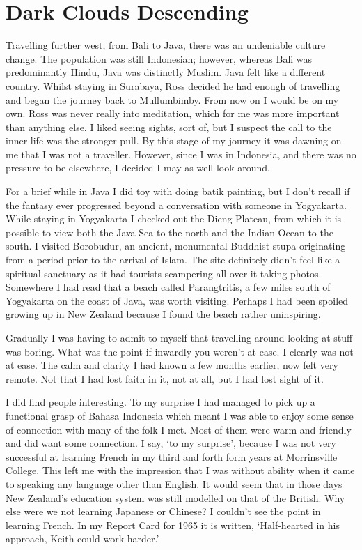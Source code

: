 \chapter{Dark Clouds Descending}

Travelling further west, from Bali to Java, there was an undeniable
culture change. The population was still Indonesian; however, whereas
Bali was predominantly Hindu, Java was distinctly Muslim. Java felt like
a different country. Whilst staying in Surabaya, Ross decided he had
enough of travelling and began the journey back to Mullumbimby. From now
on I would be on my own. Ross was never really into meditation, which
for me was more important than anything else. I liked seeing sights,
sort of, but I suspect the call to the inner life was the stronger pull.
By this stage of my journey it was dawning on me that I was not a
traveller. However, since I was in Indonesia, and there was no pressure
to be elsewhere, I decided I may as well look around.

For a brief while in Java I did toy with doing batik painting, but I
don't recall if the fantasy ever progressed beyond a conversation with
someone in Yogyakarta. While staying in Yogyakarta I checked out the
Dieng Plateau, from which it is possible to view both the Java Sea to
the north and the Indian Ocean to the south. I visited Borobudur\cite{borobudur},
an ancient, monumental Buddhist stupa originating from a
period prior to the arrival of Islam. The site definitely didn't feel
like a spiritual sanctuary as it had tourists scampering all over it
taking photos. Somewhere I had read that a beach called Parangtritis, a
few miles south of Yogyakarta on the coast of Java, was worth visiting.
Perhaps I had been spoiled growing up in New Zealand because I found the
beach rather uninspiring.

Gradually I was having to admit to myself that travelling around looking
at stuff was boring. What was the point if inwardly you weren't at ease.
I clearly was not at ease. The calm and clarity I had known a few months
earlier, now felt very remote. Not that I had lost faith in it, not at
all, but I had lost sight of it.

I did find people interesting. To my surprise I had managed to pick up a
functional grasp of Bahasa Indonesia\cite{bahasa}
which meant I was able to enjoy some sense of
connection with many of the folk I met. Most of them were warm and
friendly and did want some connection. I say, `to my surprise', because
I was not very successful at learning French in my third and forth form
years at Morrinsville College. This left me with the impression that I
was without ability when it came to speaking any language other than
English. It would seem that in those days New Zealand's education system
was still modelled on that of the British. Why else were we not learning
Japanese or Chinese? I couldn't see the point in learning French. In my
Report Card for 1965 it is written, `Half-hearted in his approach, Keith
could work harder.'

